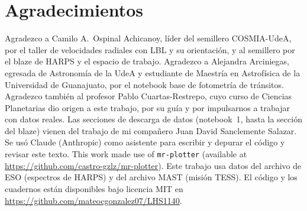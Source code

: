 \documentclass[twocolumn,aps,pra,11pt]{revtex4-2}
\begin{document}
\section*{Agradecimientos}

Agradezco a Camilo A.\ Ospinal Achicanoy, líder del semillero COSMIA-UdeA, por el taller de velocidades radiales con LBL y su orientación, y al semillero por el blaze de HARPS y el espacio de trabajo. Agradezco a Alejandra Arciniegas, egresada de Astronomía de la UdeA y estudiante de Maestría en Astrofísica de la Universidad de Guanajuato, por el notebook base de fotometría de tránsitos. Agradezco también al profesor Pablo Cuartas-Restrepo, cuyo curso de Ciencias Planetarias dio origen a este trabajo, por su guía y por impulsarnos a trabajar con datos reales.
Las secciones de descarga de datos (notebook~1, hasta la sección del blaze) vienen del trabajo de mi compañero Juan David Sanclemente Salazar. Se usó Claude (Anthropic) como asistente para escribir y depurar el código y revisar este texto.
This work made use of \texttt{mr-plotter} (available at \url{https://github.com/castro-gzlz/mr-plotter}). Este trabajo usa datos del archivo de ESO (espectros de HARPS) y del archivo MAST (misión TESS). El código y los cuadernos están disponibles bajo licencia MIT en \url{https://github.com/mateocgonzalez07/LHS1140}.
\end{document}
